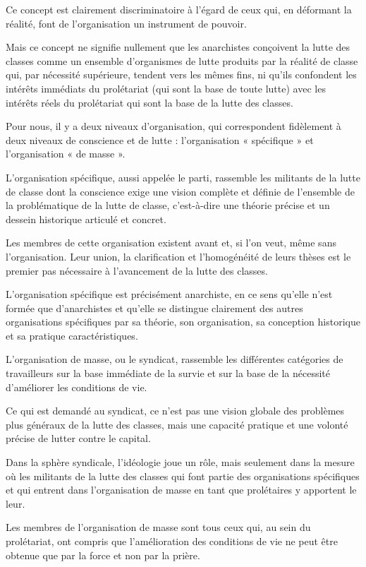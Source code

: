 Ce concept est clairement discriminatoire à l'égard de ceux qui, en déformant la réalité, font de l'organisation un instrument de pouvoir.

Mais ce concept ne signifie nullement que les anarchistes conçoivent la lutte des classes comme un ensemble d'organismes de lutte produits par la réalité de classe qui, par nécessité supérieure, tendent vers les mêmes fins, ni qu'ils confondent les intérêts immédiats du prolétariat (qui sont la base de toute lutte) avec les intérêts réels du prolétariat qui sont la base de la lutte des classes.

Pour nous, il y a deux niveaux d'organisation, qui correspondent fidèlement à deux niveaux de conscience et de lutte : l'organisation « spécifique » et l'organisation « de masse ».

L'organisation spécifique, aussi appelée le parti, rassemble les militants de la lutte de classe dont la conscience exige une vision complète et définie de l'ensemble de la problématique de la lutte de classe, c'est-à-dire une théorie précise et un dessein historique articulé et concret.

Les membres de cette organisation existent avant et, si l'on veut, même sans l'organisation. Leur union, la clarification et l'homogénéité de leurs thèses est le premier pas nécessaire à l'avancement de la lutte des classes.

L'organisation spécifique  est précisément anarchiste, en ce sens qu'elle n'est formée que d'anarchistes et qu'elle se distingue clairement des autres organisations spécifiques  par sa théorie, son organisation, sa conception historique et sa pratique caractéristiques.

L'organisation de masse, ou le syndicat, rassemble les différentes catégories de travailleurs sur la base immédiate de la survie et sur la base de la nécessité d'améliorer les conditions de vie.

Ce qui est demandé au syndicat, ce n'est pas une vision globale des problèmes plus généraux de la lutte des classes, mais une capacité pratique et une volonté précise de lutter contre le capital.

Dans la sphère syndicale, l'idéologie joue un rôle, mais seulement dans la mesure où les militants de la lutte des classes qui font partie des organisations spécifiques et qui entrent dans l'organisation de masse en tant que prolétaires y apportent le leur.

Les membres de l'organisation de masse sont tous ceux qui, au sein du prolétariat, ont compris que l'amélioration des conditions de vie ne peut être obtenue que par la force et non par la prière.

